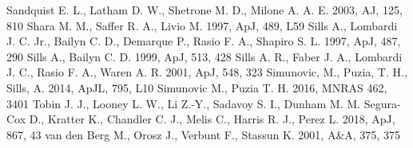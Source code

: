 \documentclass{aastex62}
\begin{document}
\begin{thebibliography}{}
 Sandquist E. L., Latham D. W., Shetrone M. D., Milone A. A. E. 2003, AJ, 125, 810
 Shara M. M., Saffer R. A., Livio M. 1997,
  ApJ, 489, L59
 Sills A., Lombardi J. C. Jr.,
Bailyn C. D., Demarque P., Rasio F. A., Shapiro S. L. 1997, ApJ, 487, 290
 Sills A., Bailyn C. D. 1999,
  ApJ, 513, 428
 Sills A. R., Faber J. A.,
  Lombardi J. C., Rasio F. A., Waren A. R. 2001, ApJ, 548, 323
 Simunovic, M., Puzia, T. H., Sills, A. 2014, ApJL, 795, L10
 Simunovic M., Puzia T. H. 2016, MNRAS 462, 3401
 Tobin J. J., Looney L. W., Li Z.-Y., Sadavoy S. I., Dunham M. M. Segura-Cox D., Kratter K., Chandler C. J., Melis C., Harris R. J., Perez L. 2018, ApJ, 867, 43 
 van den Berg M., Orosz J., Verbunt F., Stassun K. 2001, A\&A, 375, 375

\end{thebibliography}
\end{document}
